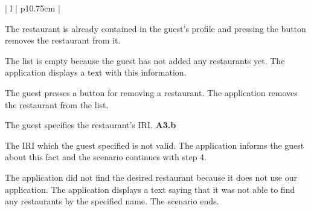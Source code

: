 \begin{center}
\begin{tabular}{| l | p{10.75cm} | }
\begin{minipage}[t]{\linewidth}
\begin{description}[nosep,after=\strut]
        \item [A1.b:] The restaurant is already contained in the guest's profile and pressing the button removes the restaurant from it.
        \item [A2:] The list is empty because the guest has not added any restaurants yet. The application displays a text with this information.
        \item [A3:] The guest presses a button for removing a restaurant. The application removes the restaurant from the list.
        \item [A4:] The guest specifies the restaurant's IRI. \textbf{A3.b}   
        \item [A4.b:] The IRI which the guest specified is not valid. The application informs the guest about this fact and the scenario continues with step 4.
        \item [A5:] The application did not find the desired restaurant because it does not use our application. The application displays a text saying that it was not able to find any restaurants by the specified name. The scenario ends.
      \end{description}
    \end{minipage}
    \\
    \hline
  \end{tabular}
  \newline
\end{center}

\newpage